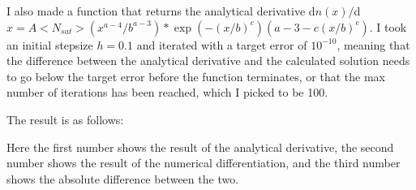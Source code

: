 I also made a function that returns the analytical derivative d$n(x)/$d$x = A <N_{sat}> (x^{a-4}/b^{a-3})*\exp(-(x/b)^c)  (a-3-c (x/b)^c)$.
I took an initial stepsize $h = 0.1$ and iterated with a target error of $10^{-10}$, meaning that the difference between the analytical derivative and the calculated solution needs to go below the target error before the function terminates, or that the max number of iterations has been reached, which I picked to be 100.

The result is as follows:



Here the first number shows the result of the analytical derivative, the second number shows the result of the numerical differentiation, and the third number shows the absolute difference between the two.



